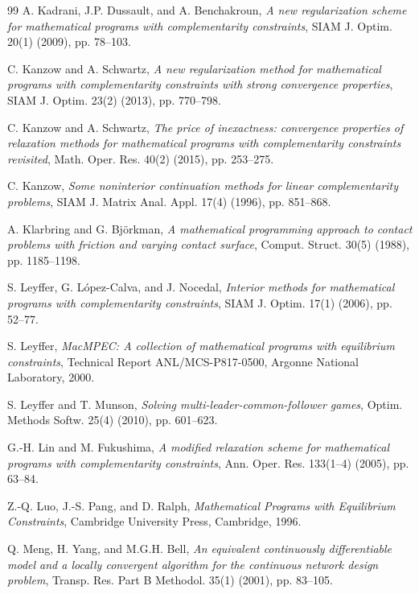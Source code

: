 \begin{thebibliography}{99}
A. Kadrani, J.P. Dussault, and A. Benchakroun, \emph{A new
regularization scheme for mathematical programs with complementarity
constraints}, SIAM J. Optim. 20(1) (2009), pp. 78--103.


C. Kanzow and A. Schwartz, \emph{A new regularization method for
mathematical programs with complementarity constraints with strong
convergence properties}, SIAM J. Optim. 23(2) (2013), pp. 770--798.


C. Kanzow and A. Schwartz, \emph{The price of inexactness: convergence
properties of relaxation methods for mathematical programs with
complementarity constraints revisited}, Math. Oper. Res. 40(2) (2015),
pp. 253--275.


C. Kanzow, \emph{Some noninterior continuation methods for linear
complementarity problems}, SIAM J. Matrix Anal. Appl. 17(4) (1996),
pp. 851--868.


A. Klarbring and G. Bj\"{o}rkman, \emph{A mathematical programming approach to contact problems with friction and varying contact surface},
Comput. Struct. 30(5) (1988), pp. 1185--1198.


S. Leyffer, G. L\'{o}pez-Calva, and J. Nocedal, \emph{Interior methods
for mathematical programs with complementarity constraints},
SIAM J. Optim. 17(1) (2006), pp. 52--77.


S. Leyffer, \emph{MacMPEC: A collection of mathematical programs with
equilibrium constraints}, Technical Report ANL/MCS-P817-0500, Argonne
National Laboratory, 2000.


S. Leyffer and T. Munson, \emph{Solving multi-leader-common-follower games},
Optim. Methods Softw. 25(4) (2010), pp. 601--623.


G.-H. Lin and M. Fukushima, \emph{A modified relaxation scheme for
mathematical programs with complementarity constraints},
Ann. Oper. Res. 133(1--4) (2005), pp. 63--84.


Z.-Q. Luo, J.-S. Pang, and D. Ralph, \emph{Mathematical Programs with
Equilibrium Constraints}, Cambridge University Press, Cambridge, 1996.


Q. Meng, H. Yang, and M.G.H. Bell, \emph{An equivalent continuously differentiable model and a locally convergent algorithm for the continuous network design problem},
Transp. Res. Part B Methodol. 35(1) (2001), pp. 83--105.



\end{thebibliography}
